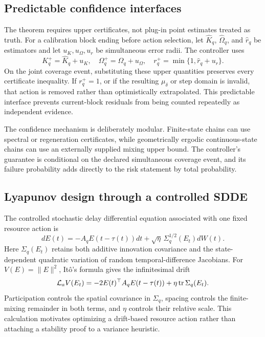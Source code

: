 \documentclass[journal]{IEEEtran}
\newcommand{\tr}{\operatorname{tr}}
\begin{document}
\subsection{Predictable confidence interfaces}
The theorem requires upper certificates, not plug-in point estimates treated as truth.
For a calibration block ending before action selection, let $\widehat K_q$, $\widehat\Omega_q$, and $\widehat r_q$ be estimators and let $u_K,u_\Omega,u_r$ be simultaneous error radii.
The controller uses
\begin{equation}
K_q^+=\widehat K_q+u_K,
\quad
\Omega_q^+=\widehat\Omega_q+u_\Omega,
\quad
r_q^+=\min\{1,\widehat r_q+u_r\}.
\label{eq:upper-interfaces}
\end{equation}
On the joint coverage event, substituting these upper quantities preserves every certificate inequality.
If $r_q^+=1$, or if the resulting $\mu_\delta$ or step domain is invalid, that action is removed rather than optimistically extrapolated.
This predictable interface prevents current-block residuals from being counted repeatedly as independent evidence.

The confidence mechanism is deliberately modular.
Finite-state chains can use spectral or regeneration certificates, while geometrically ergodic continuous-state chains can use an externally supplied mixing upper bound.
The controller's guarantee is conditional on the declared simultaneous coverage event, and its failure probability adds directly to the risk statement by total probability.

\subsection{Lyapunov design through a controlled SDDE}
The controlled stochastic delay differential equation associated with one fixed resource action is
\begin{equation}
dE(t)=-A_qE(t-\tau(t))dt
+\sqrt{\eta}\,\Sigma_q^{1/2}(E_t)dW(t).
\label{eq:controlled-sdde}
\end{equation}
Here $\Sigma_q(E_t)$ retains both additive innovation covariance and the state-dependent quadratic variation of random temporal-difference Jacobians.
For $V(E)=\|E\|^2$, It\^o's formula gives the infinitesimal drift
\begin{equation}
{\cal L}_aV(E_t)
=-2E(t)^\top A_qE(t-\tau(t))
+\eta\tr\Sigma_q(E_t).
\label{eq:ito-drift}
\end{equation}
Participation controls the spatial covariance in $\Sigma_q$, spacing controls the finite-mixing remainder in both terms, and $\eta$ controls their relative scale.
This calculation motivates optimizing a drift-based resource action rather than attaching a stability proof to a variance heuristic.
\end{document}
